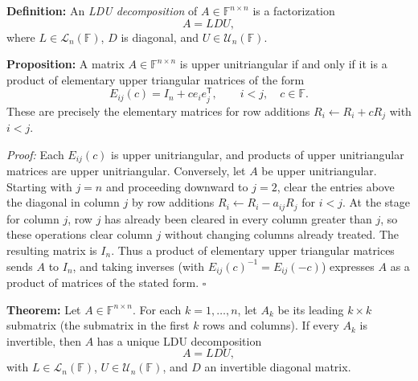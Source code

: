 \documentclass[a4paper,11pt,abstract=true]{scrartcl}
\theoremstyle{dotlessP}
\theoremstyle{dotlessS}
\theoremstyle{remark}
\theoremstyle{definition}
\begin{document}
\begin{definition_box}
\textbf{Definition:} An \emph{LDU decomposition} of
$A\in\mathbb{F}^{n\times n}$ is a factorization
\[
A=LDU,
\]
where $L\in\mathcal{L}_n(\mathbb{F})$, $D$ is diagonal, and
$U\in\mathcal{U}_n(\mathbb{F})$.
\end{definition_box}

\begin{problem_box}
\textbf{Proposition:} A matrix $A\in\mathbb{F}^{n\times n}$ is
upper unitriangular if and only if it is a product of elementary
upper triangular matrices of the form
\[
E_{ij}(c)=I_n+c e_i e_j^{\mathsf T},\qquad i<j,\quad c\in\mathbb{F}.
\]
These are precisely the elementary matrices for row additions
$R_i\leftarrow R_i+cR_j$ with $i<j$.
\end{problem_box}

\begin{claim_box}
\textit{Proof:} Each $E_{ij}(c)$ is upper unitriangular, and products
of upper unitriangular matrices are upper unitriangular. Conversely,
let $A$ be upper unitriangular. Starting with $j=n$ and proceeding
downward to $j=2$, clear the entries above the diagonal in column $j$
by row additions $R_i\leftarrow R_i-a_{ij}R_j$ for $i<j$. At the
stage for column $j$, row $j$ has already been cleared in every column
greater than $j$, so these operations clear column $j$ without
changing columns already treated. The resulting matrix is $I_n$.
Thus a product of elementary upper triangular matrices sends $A$ to
$I_n$, and taking inverses (with $E_{ij}(c)^{-1}=E_{ij}(-c)$) expresses
$A$ as a product of matrices of the stated form. \hfill$\square$
\end{claim_box}

\begin{problem_box}
\textbf{Theorem:} Let $A\in\mathbb{F}^{n\times n}$. For each
$k=1,\ldots,n$, let $A_k$ be its leading $k\times k$ submatrix
(the submatrix in the first $k$ rows and columns). If every $A_k$ is
invertible, then $A$ has a unique LDU decomposition
\[
A=LDU,
\]
with $L\in\mathcal{L}_n(\mathbb{F})$, $U\in\mathcal{U}_n(\mathbb{F})$,
and $D$ an invertible diagonal matrix.
\end{problem_box}
\end{document}
